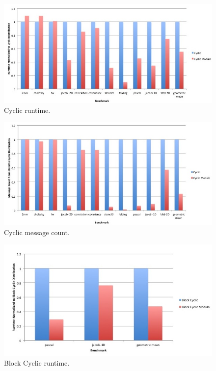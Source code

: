 \begin{figure}
	\begin{center}
	\includegraphics[scale=0.50]{./Figures/cyclic_runtime}
	\caption{Cyclic runtime.}
	\label{cyclic_runtime}
	\end{center}
\end{figure}

\begin{figure}
	\begin{center}
	\includegraphics[scale=0.50]{./Figures/cyclic_message_count}
	\caption{Cyclic message count.}
	\label{cyclic_message_count}
	\end{center}
\end{figure}

\begin{figure}
	\begin{center}
	\includegraphics[scale=0.50]{./Figures/block_cyclic_runtime}
	\caption{Block Cyclic runtime.}
	\label{block_cyclic_runtime}
	\end{center}
\end{figure}

